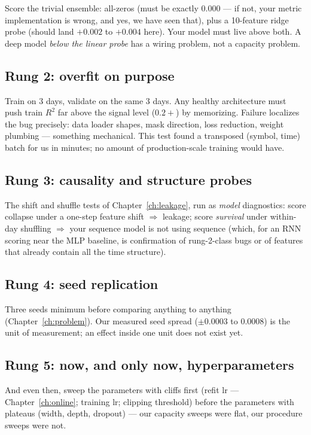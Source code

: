 Score the trivial ensemble: all-zeros (must be exactly $0.000$ --- if not,
your metric implementation is wrong, and yes, we have seen that), plus a
10-feature ridge probe (should land $+0.002$ to $+0.004$ here). Your model
must live above both. A deep model \emph{below the linear probe} has a
wiring problem, not a capacity problem.

\subsection{Rung 2: overfit on purpose}

Train on 3 days, validate on the same 3 days. Any healthy architecture
must push train $R^2$ far above the signal level ($0.2+$) by memorizing.
Failure localizes the bug precisely: data loader shapes, mask direction,
loss reduction, weight plumbing --- something mechanical. This test found
a transposed (symbol, time) batch for us in minutes; no amount of
production-scale training would have.

\subsection{Rung 3: causality and structure probes}

The shift and shuffle tests of Chapter~\ref{ch:leakage}, run as
\emph{model} diagnostics: score collapse under a one-step feature shift
$\Rightarrow$ leakage; score \emph{survival} under within-day shuffling
$\Rightarrow$ your sequence model is not using sequence (which, for an
RNN scoring near the MLP baseline, is confirmation of rung-2-class bugs
or of features that already contain all the time structure).

\subsection{Rung 4: seed replication}

Three seeds minimum before comparing anything to anything
(Chapter~\ref{ch:problem}). Our measured seed spread ($\pm 0.0003$ to
$0.0008$) is the unit of measurement; an effect inside one unit does not
exist yet.

\subsection{Rung 5: now, and only now, hyperparameters}

And even then, sweep the parameters with cliffs first (refit lr ---
Chapter~\ref{ch:online}; training lr; clipping threshold) before the
parameters with plateaus (width, depth, dropout) --- our capacity sweeps
were flat, our procedure sweeps were not.

